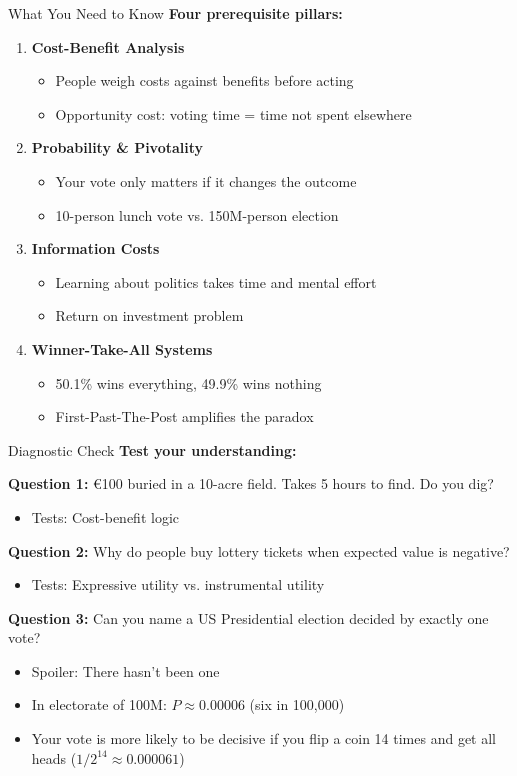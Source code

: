 \documentclass[10pt]{beamer}
\begin{document}
\begin{frame}{What You Need to Know}
\textbf{Four prerequisite pillars:}
\begin{enumerate}
\item \textbf{Cost-Benefit Analysis}
\begin{itemize}
\item People weigh costs against benefits before acting
\item Opportunity cost: voting time = time not spent elsewhere
\end{itemize}

\item \textbf{Probability \& Pivotality}
\begin{itemize}
\item Your vote only matters if it changes the outcome
\item 10-person lunch vote vs. 150M-person election
\end{itemize}

\item \textbf{Information Costs}
\begin{itemize}
\item Learning about politics takes time and mental effort
\item Return on investment problem
\end{itemize}

\item \textbf{Winner-Take-All Systems}
\begin{itemize}
\item 50.1\% wins everything, 49.9\% wins nothing
\item First-Past-The-Post amplifies the paradox
\end{itemize}
\end{enumerate}
\end{frame}

\begin{frame}{Diagnostic Check}
\textbf{Test your understanding:}


\textbf{Question 1:} €100 buried in a 10-acre field. Takes 5 hours to find. Do you dig?
\begin{itemize}
\item Tests: Cost-benefit logic
\end{itemize}


\textbf{Question 2:} Why do people buy lottery tickets when expected value is negative?
\begin{itemize}
\item Tests: Expressive utility vs. instrumental utility
\end{itemize}


\textbf{Question 3:} Can you name a US Presidential election decided by exactly one vote?
\begin{itemize}
\item \alert{Spoiler:} There hasn't been one
\item In electorate of 100M: $P \approx 0.00006$ (six in 100,000)
\item Your vote is more likely to be decisive if you flip a coin 14 times and get all heads ($1/2^{14} \approx 0.000061$)
\end{itemize}
\end{frame}
\end{document}
